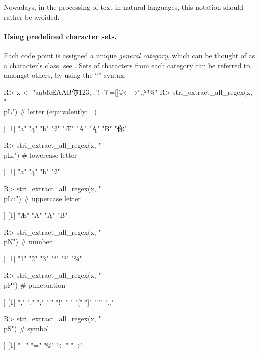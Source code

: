 \documentclass[nojss]{jss}\usepackage[]{graphicx}\usepackage[]{color}
\begin{document}
Nowadays, in the processing of text in natural languages, this
notation should rather be avoided.


\paragraph{Using predefined character sets.}
Each code point is assigned a unique \textit{general category},
which can be thought of as a character's class,
see \citep{usa44:ucd}.
Sets of characters from each category can be referred to,
amongst others, by using the ``'' syntax:

\begin{Schunk}
\begin{Sinput}
R> x <- "aąbßÆAĄB你123,.;'! \t-+=[]©←→”„²³¾"
R> stri_extract_all_regex(x, "\\p{L}")   # letter (equivalently: [])
\end{Sinput}
\begin{Soutput}
[[1]]
[1] "a"  "ą"  "b"  "ß"  "Æ"  "A"  "Ą"  "B"  "你"
\end{Soutput}
\begin{Sinput}
R> stri_extract_all_regex(x, "\\p{Ll}")  # lowercase letter
\end{Sinput}
\begin{Soutput}
[[1]]
[1] "a" "ą" "b" "ß"
\end{Soutput}
\begin{Sinput}
R> stri_extract_all_regex(x, "\\p{Lu}")  # uppercase letter
\end{Sinput}
\begin{Soutput}
[[1]]
[1] "Æ" "A" "Ą" "B"
\end{Soutput}
\begin{Sinput}
R> stri_extract_all_regex(x, "\\p{N}")   # number
\end{Sinput}
\begin{Soutput}
[[1]]
[1] "1" "2" "3" "²" "³" "¾"
\end{Soutput}
\begin{Sinput}
R> stri_extract_all_regex(x, "\\p{P}")   # punctuation
\end{Sinput}
\begin{Soutput}
[[1]]
 [1] "," "." ";" "'" "!" "-" "[" "]" "”" "„"
\end{Soutput}
\begin{Sinput}
R> stri_extract_all_regex(x, "\\p{S}")   # symbol
\end{Sinput}
\begin{Soutput}
[[1]]
[1] "+" "=" "©" "←" "→"
\end{Soutput}
\end{Schunk}
\end{document}
